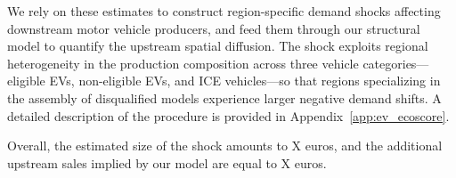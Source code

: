 We rely on these estimates to construct region-specific demand shocks affecting downstream motor vehicle producers, and feed them through our structural model to quantify the upstream spatial diffusion. The shock exploits regional heterogeneity in the production composition across three vehicle categories---eligible EVs, non-eligible EVs, and ICE vehicles---so that regions specializing in the assembly of disqualified models experience larger negative demand shifts. A detailed description of the procedure is provided in Appendix~\ref{app:ev_ecoscore}.
 
Overall, the estimated size of the shock amounts to X euros, and the additional upstream sales implied by our model are equal to X euros.

